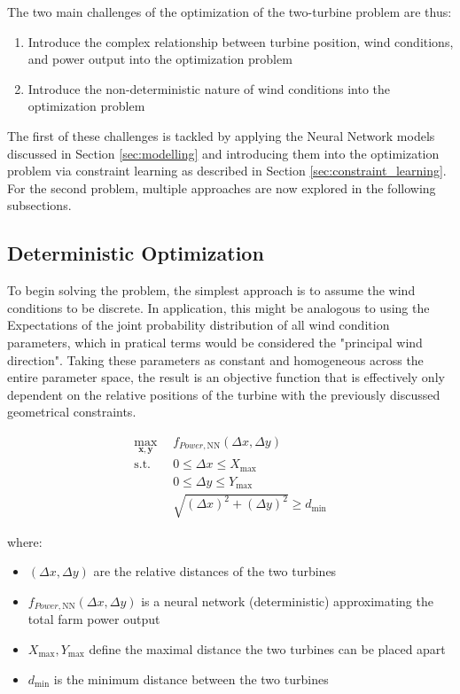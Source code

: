 The two main challenges of the optimization of the two-turbine problem are thus: 

\begin{enumerate}
	\item Introduce the complex relationship between turbine position, wind conditions, and power output into the optimization problem
	\item Introduce the non-deterministic nature of wind conditions into the optimization problem
\end{enumerate}

The first of these challenges is tackled by applying the Neural Network models discussed in Section \ref{sec:modelling} and introducing them into the optimization problem via constraint learning as described in Section \ref{sec:constraint_learning}. For the second problem, multiple approaches are now explored in the following subsections.


\subsection{Deterministic Optimization}

To begin solving the problem, the simplest approach is to assume the wind conditions to be discrete. In application, this might be analogous to using the Expectations of the joint probability distribution of all wind condition parameters, which in pratical terms would be considered the "principal wind direction". Taking these parameters as constant and homogeneous across the entire parameter space, the result is an objective function that is effectively only dependent on the relative positions of the turbine with the previously discussed geometrical constraints.

\begin{align}
	\max_{\mathbf{x}, \mathbf{y}} & f_{Power,\text{NN}}(\Delta x, \Delta y) \\
	\text{s.t.} \quad 
	&  0 \leq \Delta x \leq X_{\max} \\
	&  0 \leq \Delta y \leq Y_{\max} \\
	& \sqrt{(\Delta x)^2 + (\Delta y)^2} \geq d_{\min}
\end{align}

where:
\begin{itemize}
	\item \( (\Delta x, \Delta y) \) are the relative distances of the two turbines
	\item \( f_{Power, \text{NN}}(\Delta x, \Delta y)\) is a neural network (deterministic) approximating the total farm power output
	\item \(  X_{\max}, Y_{\max} \) define the maximal distance the two turbines can be placed apart
	\item \( d_{\min} \) is the minimum distance between the two turbines
\end{itemize}



